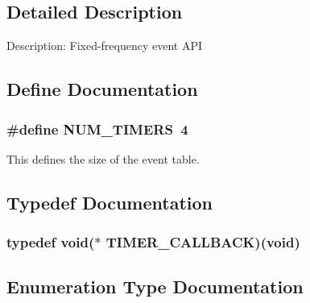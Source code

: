 \subsection{Detailed Description}
Description: Fixed-\/frequency event API 

\subsection{Define Documentation}
\subsubsection[{NUM\_\-TIMERS}]{\setlength{\rightskip}{0pt plus 5cm}\#define NUM\_\-TIMERS~4}\label{timer_8h_a34ad18456588200cc4dd40de41ba33f6}


This defines the size of the event table. 

\subsection{Typedef Documentation}
\subsubsection[{TIMER\_\-CALLBACK}]{\setlength{\rightskip}{0pt plus 5cm}typedef void($\ast$ {\bf TIMER\_\-CALLBACK})(void)}\label{timer_8h_afa050ddedd1442bab569c29062a646bc}


\subsection{Enumeration Type Documentation}
